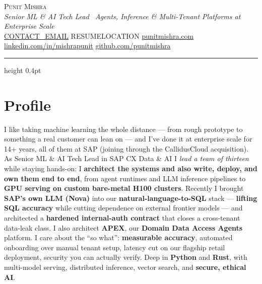 
\begin{center}
  {\huge\scshape Punit Mishra}\\[4pt]
  {\itshape Senior ML \& AI Tech Lead \textbar\ Agents, Inference \& Multi-Tenant Platforms at Enterprise Scale}\\[6pt]
  {\small
    \href{mailto:CONTACT_EMAIL}{CONTACT\_EMAIL} \;\textbar\;
    RESUMELOCATION \;\textbar\;
    \href{https://punitmishra.com}{punitmishra.com} \;\textbar\;
    \href{https://linkedin.com/in/mishrapunit}{linkedin.com/in/mishrapunit} \;\textbar\;
    \href{https://github.com/punitmishra}{github.com/punitmishra}
  }
\end{center}
\vspace{2pt}\hrule height 0.4pt\vspace{2pt}

\section{Profile}
I like taking machine learning the whole distance --- from rough prototype to something a real
customer can lean on --- and I've done it at enterprise scale for 14+ years, all of them at SAP
(joining through the CallidusCloud acquisition). As Senior ML \& AI Tech Lead in SAP CX Data \& AI I
\emph{lead a team of thirteen} while staying hands-on: I \textbf{architect the systems and also write,
deploy, and own them end to end}, from agent runtimes and LLM inference pipelines to \textbf{GPU serving
on custom bare-metal H100 clusters}. Recently I brought \textbf{SAP's own LLM (Nova)} into our
\textbf{natural-language-to-SQL} stack --- \textbf{lifting SQL accuracy} while cutting dependence on
external frontier models --- and architected a \textbf{hardened internal-auth contract} that closes a
cross-tenant data-leak class. I also architect \textbf{APEX}, our \textbf{Domain Data Access Agents}
platform. I care about the ``so what'': \textbf{measurable accuracy}, automated onboarding over manual
tenant setup, latency cut on our flagship retail deployment, security you can actually verify. Deep in
\textbf{Python} and \textbf{Rust}, with multi-model serving, distributed inference, vector search, and
\textbf{secure, ethical AI}.

